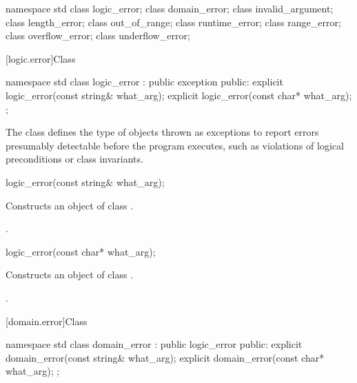 \begin{codeblock}
namespace std {
  class logic_error;
    class domain_error;
    class invalid_argument;
    class length_error;
    class out_of_range;
  class runtime_error;
    class range_error;
    class overflow_error;
    class underflow_error;
}
\end{codeblock}

[logic.error]{Class }

%
\begin{codeblock}
namespace std {
  class logic_error : public exception {
  public:
    explicit logic_error(const string& what_arg);
    explicit logic_error(const char* what_arg);
  };
}
\end{codeblock}

\pnum
The class
defines the type of objects thrown as
exceptions to report errors presumably detectable before
the program executes, such as violations of logical preconditions or class
invariants.

%
\begin{itemdecl}
logic_error(const string& what_arg);
\end{itemdecl}

\begin{itemdescr}
\pnum
\effects
Constructs an object of class
.

\pnum
\postcondition
{}.
\end{itemdescr}

%
\begin{itemdecl}
logic_error(const char* what_arg);
\end{itemdecl}

\begin{itemdescr}
\pnum
\effects
Constructs an object of class
.

\pnum
\postcondition
{}.
\end{itemdescr}

[domain.error]{Class }

%
\begin{codeblock}
namespace std {
  class domain_error : public logic_error {
  public:
    explicit domain_error(const string& what_arg);
    explicit domain_error(const char* what_arg);
  };
}
\end{codeblock}

